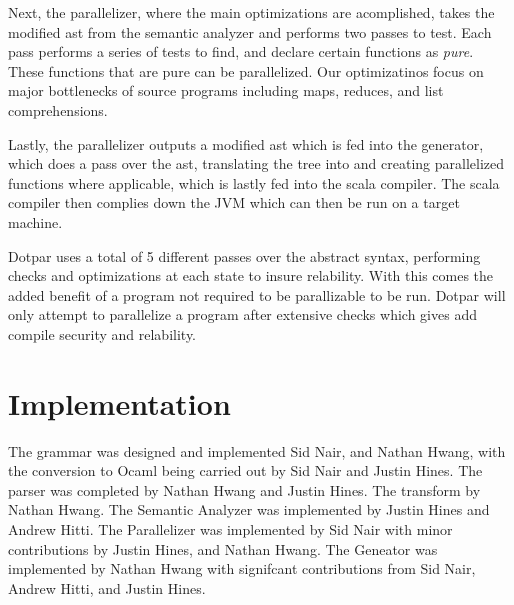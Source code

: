 Next, the parallelizer, where the main optimizations are acomplished, takes 
the modified ast from the semantic analyzer and performs two passes to test. 
Each pass performs a series of tests to find, and declare certain functions as \emph{pure}.
These functions that are pure can be parallelized. Our optimizatinos focus on major
bottlenecks of source programs including maps, reduces, and list comprehensions.

Lastly, the parallelizer outputs a modified ast which is fed into the generator, 
which does a pass over the ast, translating the tree into and creating parallelized 
functions where applicable, which is lastly fed into the scala compiler.  The
scala compiler then complies down the JVM which can then be run on a target machine.

Dotpar uses a total of 5 different passes over the abstract syntax, performing 
checks and optimizations at each state to insure relability.  With this comes
the added benefit of a program not required to be parallizable to be run.  Dotpar
will only attempt to parallelize a program after extensive checks which gives add 
compile security and relability.

\section{Implementation}
The grammar was designed and implemented Sid Nair, and Nathan Hwang, with the
conversion to Ocaml being carried out by Sid Nair and Justin Hines.  The parser was
completed by Nathan Hwang and Justin Hines.  The transform by Nathan Hwang.  The
Semantic Analyzer was implemented by Justin Hines and Andrew Hitti.  The Parallelizer was
implemented by Sid Nair with minor contributions by Justin Hines, and Nathan Hwang. 
The Geneator was implemented by Nathan Hwang with signifcant contributions from 
Sid Nair, Andrew Hitti, and Justin Hines.